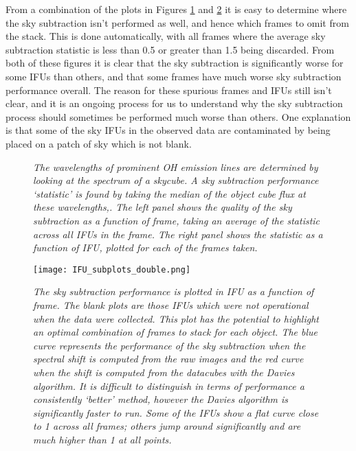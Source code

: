 \documentclass{literature}
\begin{document}
From a combination of the plots in Figures \ref{fig:sky_sub_perf} and \ref{fig:ifu_subplots} it is easy to determine where the sky subtraction isn't performed as well, and hence which frames to omit from the stack. This is done automatically, with all frames where the average sky subtraction statistic is less than 0.5 or greater than 1.5 being discarded. From both of these figures it is clear that the sky subtraction is significantly worse for some IFUs than others, and that some frames have much worse sky subtraction performance overall. The reason for these spurious frames and IFUs still isn't clear, and it is an ongoing process for us to understand why the sky subtraction process should sometimes be performed much worse than others. One explanation is that some of the sky IFUs in the observed data are contaminated by being placed on a patch of sky which is not blank. 


\begin{figure}[!htp]
\centering
{}
\caption{\footnotesize{\emph{The wavelengths of prominent OH emission lines are determined by looking at the spectrum of a skycube. A sky subtraction performance `statistic' is found by taking the median of the object cube flux at these wavelengths,. The left panel shows the quality of the sky subtraction as a function of frame, taking an average of the statistic across all IFUs in the frame. The right panel shows the statistic as a function of IFU, plotted for each of the frames taken.}}}
\label{fig:sky_sub_perf}
\end{figure}

\begin{figure}[!htp]
\centering
\texttt{[image: IFU\_subplots\_double.png]}
\caption{\footnotesize{\emph{The sky subtraction performance is plotted in IFU as a function of frame. The blank plots are those IFUs which were not operational when the data were collected. This plot has the potential to highlight an optimal combination of frames to stack for each object. The blue curve represents the performance of the sky subtraction when the spectral shift is computed from the raw images and the red curve when the shift is computed from the datacubes with the Davies algorithm. It is difficult to distinguish in terms of performance a consistently `better' method, however the Davies algorithm is significantly faster to run. Some of the IFUs show a flat curve close to 1 across all frames; others jump around significantly and are much higher than 1 at all points.}}}
\label{fig:ifu_subplots}
\end{figure}
\end{document}
